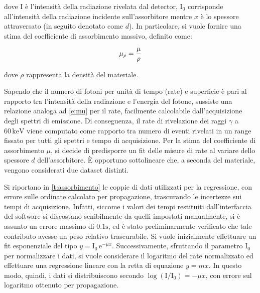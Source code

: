 \documentclass[twocolumn,10pt]{asme2ej}
\begin{document}
\noindent dove I è l'intensità della radiazione rivelata dal detector, $\text{I}_0$ corrisponde all'intensità della
radiazione incidente sull'assorbitore mentre $x$ è lo spessore attraversato (in seguito denotato come $d$). In
particolare, si vuole fornire una stima del coefficiente di assorbimento massivo, definito come:

\vspace{-15pt}
\begin{equation}
   \mu_{\rho} = \frac{\mu}{\rho}
    \vspace{-5pt}
    \label{e:mu_mass}
\end{equation}

\noindent dove $\rho$ rappresenta la densità del materiale. 

Sapendo che il numero di fotoni per unità di tempo (rate) e superficie è pari al rapporto tra l'intensità della
radiazione e l'energia del fotone, sussiste una relazione analoga ad \autoref{e:mu} per il rate, facilmente calcolabile
dall'acquisizione degli spettri di emissione. Di conseguenza, il rate di rivelazione dei raggi $\gamma$ a
$60\,\si{\kilo\electronvolt}$ viene computato come rapporto tra numero di eventi rivelati in un range fissato per tutti
gli spettri e tempo di acquisizione. Per la stima del coefficiente di assorbimento $\mu$, si decide di predisporre un
fit delle misure di rate al variare dello spessore $d$ dell'assorbitore. È opportuno sottolineare che, a seconda del
materiale, vengono considerati due dataset distinti. 

Si riportano in \autoref{t:assorbimento} le coppie di dati utilizzati per la regressione, con errore sulle ordinate
calcolato per propagazione, trascurando le incertezze sui tempi di acquisizione. Infatti, siccome i valori dei tempi
restituiti dall'interfaccia del software si discostano senibilmente da quelli impostati manualmente, si è assunto un
errore massimo di $0.1\si{\second}$, ed è stato preliminarmente verificato che tale contributo avesse un peso relativo
trascurabile. Si vuole inizialmente effettuare un fit esponenziale del tipo $y = \text{I}_0\,\text{e}^{-\mu x}$.
Successivamente, sfruttando il parametro $\text{I}_0$ per normalizzare i dati, si vuole considerare il logaritmo del
rate normalizzato ed effettuare una regressione lineare con la retta di equazione $y = mx$.  In questo modo, quindi, i
dati si distribuiscono secondo $\log(\text{I}/\text{I}_0)=-\mu x$, con errore sul logaritmo ottenuto per propagazione.
\end{document}

